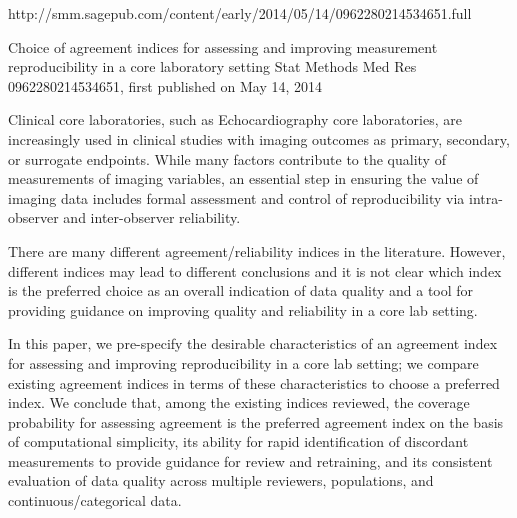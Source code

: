 http://smm.sagepub.com/content/early/2014/05/14/0962280214534651.full

Choice of agreement indices for assessing and improving measurement reproducibility in a core laboratory setting
Stat Methods Med Res 0962280214534651, first published on May 14, 2014

Clinical core laboratories, such as Echocardiography core laboratories, are increasingly used in clinical studies with imaging outcomes as primary, secondary, or surrogate endpoints. While many factors contribute to the quality of measurements of imaging variables, an essential step in ensuring the value of imaging data includes formal assessment and control of reproducibility via intra-observer and inter-observer reliability. 

There are many different agreement/reliability indices in the literature. However, different indices may lead to different conclusions and it is not clear which index is the preferred choice as an overall indication of data quality and a tool for providing guidance on improving quality and reliability in a core lab setting. 

In this paper, we pre-specify the desirable characteristics of an agreement index for assessing and improving reproducibility in a core lab setting; we compare existing agreement indices in terms of these characteristics to choose a preferred index. We conclude that, among the existing indices reviewed, the coverage probability for assessing agreement is the preferred agreement index on the basis of computational simplicity, its ability for rapid identification of discordant measurements to provide guidance for review and retraining, and its consistent evaluation of data quality across multiple reviewers, populations, and continuous/categorical data.


